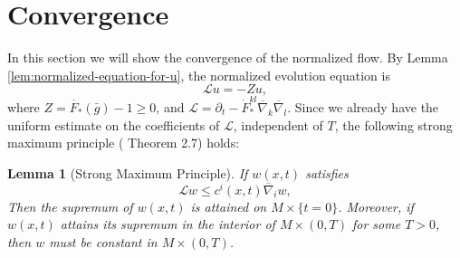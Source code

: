 \documentclass[10pt,a4paper]{amsart}
\newtheorem{lemma}[theorem]{Lemma}
\newcommand{\bnabla}{\overline{\nabla}}
\newcommand{\bg}{\bar{g}}
\numberwithin{equation}{section}
\begin{document}
\section{Convergence}\label{sec:convergence}
In this section we will show the convergence of the normalized flow. By Lemma \ref{lem:normalized-equation-for-u}, the normalized evolution equation is 
\[ \mathscr{L}u = -Z u, \]
where \(Z = \dot{F_*}(\bg)-1 \geq 0 \), and \(\mathscr{L} = \partial_t - \dot{F}_*^{kl}\bnabla_k \bnabla_l \). Since we already have the uniform estimate on the coefficients of \(\mathscr{L}\), independent of \(T\), the following strong maximum principle (\cite{Lieberman1996} Theorem 2.7) holds: 
\begin{lemma}[Strong Maximum Principle]
  If \(w(x,t)\) satisfies 
    \[ \mathscr{L}w \leq c^i(x,t) \bnabla_i w, \]
    Then the supremum of \(w(x,t)\) is attained on \(M\times \{t=0\}\). Moreover, if \(w(x,t)\) attains its supremum in the interior of \(M \times (0,T)\) for some \(T > 0\), then \(w\) must be constant in \(M \times (0,T)\). 
\end{lemma}
\end{document}
